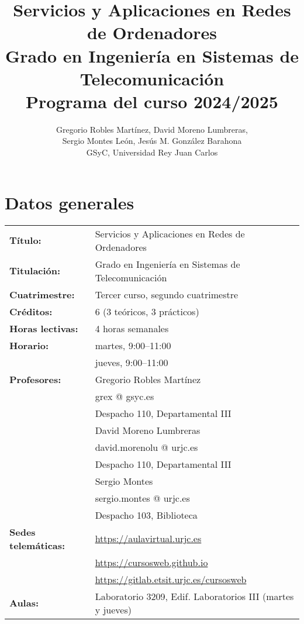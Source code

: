 \documentclass[a4paper,12pt]{article}
\title{Servicios y Aplicaciones en Redes de Ordenadores \\
Grado en Ingeniería en Sistemas de Telecomunicación \\
Programa del curso 2024/2025}
\author{Gregorio Robles Martínez,  David Moreno Lumbreras, \\
Sergio Montes León, Jesús M. González Barahona \\
GSyC, Universidad Rey Juan Carlos}
\begin{document}
\maketitle

\tableofcontents

\newpage

\section{Datos generales}

\begin{tabular}{ll}
\textbf{Título:} & Servicios y Aplicaciones en Redes de Ordenadores  \\
\textbf{Titulación:} & Grado en Ingeniería en Sistemas de Telecomunicación \\
\textbf{Cuatrimestre:} & Tercer curso, segundo cuatrimestre \\
\textbf{Créditos:} & 6 (3 teóricos, 3 prácticos) \\
\textbf{Horas lectivas:} & 4 horas semanales \\
\textbf{Horario:} & martes, 9:00--11:00 \\
                  & jueves, 9:00--11:00 \\
\textbf{Profesores:}
& Gregorio Robles Martínez\\
& \hspace{1cm}grex @ gsyc.es \\
& \hspace{1cm}Despacho 110, Departamental III\\
& David Moreno Lumbreras \\
& \hspace{1cm}david.morenolu @ urjc.es \\
& \hspace{1cm}Despacho 110, Departamental III\\
& Sergio Montes\\
& \hspace{1cm}sergio.montes @ urjc.es \\
& \hspace{1cm}Despacho 103, Biblioteca\\
\textbf{Sedes telemáticas:} & \url{https://aulavirtual.urjc.es} \\
                            & \url{https://cursosweb.github.io} \\
                            & \url{https://gitlab.etsit.urjc.es/cursosweb} \\
\textbf{Aulas:} & Laboratorio 3209, Edif. Laboratorios III (martes y jueves) \\
\end{tabular}
\end{document}
